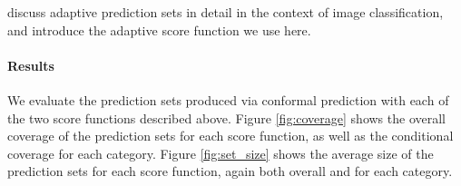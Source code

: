 \documentclass[a4paper, 12pt]{article}
\begin{document}
\textcite{angelopoulosUncertaintySetsImage2022} discuss adaptive prediction sets in detail in the context of image classification, and introduce the adaptive score function we use here.

\paragraph*{Results} We evaluate the prediction sets produced via conformal prediction with each of the two score functions described above. Figure \ref{fig:coverage} shows the overall coverage of the prediction sets for each score function, as well as the conditional coverage for each category. Figure \ref{fig:set_size} shows the average size of the prediction sets for each score function, again both overall and for each category.
\end{document}
